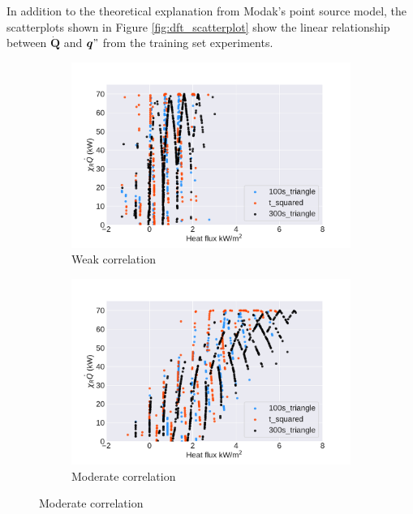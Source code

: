 \documentclass{article}
\begin{document}
In addition to the theoretical explanation from Modak's point source model, the scatterplots shown in Figure \ref{fig:dft_scatterplot} show the linear relationship between $\boldsymbol{\dot{Q}}$ and $\boldsymbol{q}"$ from the training set experiments. 

\begin{figure}[htbp]
  \centering
  \begin{subfigure}[t]{.45\textwidth}
      \centering
      \includegraphics[width=\textwidth,keepaspectratio]{figures/weak_dft_scatter.pdf}
      \caption{Weak correlation}
      \label{fig:weak_scatter}
  \end{subfigure}
  \begin{subfigure}[t]{.45\textwidth}
      \centering
      \includegraphics[width=\textwidth ,keepaspectratio]{figures/moderate_dft_scatter.pdf}
      \caption{Moderate correlation}
      \label{fig:moderate_scatter}

\end{subfigure}
\end{figure}
\end{document}
